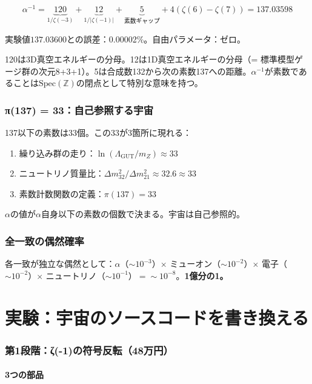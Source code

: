 \documentclass[12pt,a4paper]{article}
\newcommand{\Spec}{\mathrm{Spec}}
\begin{document}
$$\alpha^{-1} = \underbrace{120}_{1/\zeta(-3)} + \underbrace{12}_{1/|\zeta(-1)|} + \underbrace{5}_{\text{素数ギャップ}} + 4(\zeta(6) - \zeta(7)) = 137.03598$$

実験値$137.03600$との誤差：0.00002\%。自由パラメータ：ゼロ。

120は3D真空エネルギーの分母。12は1D真空エネルギーの分母（= 標準模型ゲージ群の次元8+3+1）。5は合成数132から次の素数137への距離。$\alpha^{-1}$が素数であることは$\Spec(\mathbb{Z})$の閉点として特別な意味を持つ。

\section{π(137) = 33：自己参照する宇宙}

137以下の素数は33個。この33が3箇所に現れる：
\begin{enumerate}
\item 繰り込み群の走り：$\ln(\Lambda_{\mathrm{GUT}}/m_Z) \approx 33$
\item ニュートリノ質量比：$\Delta m^2_{32}/\Delta m^2_{21} \approx 32.6 \approx 33$
\item 素数計数関数の定義：$\pi(137) = 33$
\end{enumerate}

$\alpha$の値が$\alpha$自身以下の素数の個数で決まる。宇宙は自己参照的。

\section{全一致の偶然確率}

各一致が独立な偶然として：$\alpha$（$\sim 10^{-3}$）$\times$ ミューオン（$\sim 10^{-2}$）$\times$ 電子（$\sim 10^{-2}$）$\times$ ニュートリノ（$\sim 10^{-1}$）$= \sim 10^{-8}$。\textbf{1億分の1。}

\part{実験：宇宙のソースコードを書き換える}

\section{第1段階：ζ(-1)の符号反転（48万円）}

\subsection{3つの部品}
\end{document}
